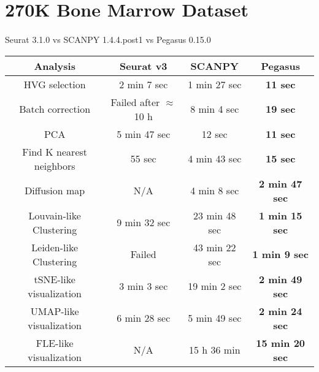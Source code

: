 \documentclass[10pt]{article}
\begin{document}
\section{270K Bone Marrow Dataset}

\paragraph{}
Seurat 3.1.0 \qquad vs \qquad SCANPY 1.4.4.post1 \qquad vs \qquad Pegasus 0.15.0

\begin{table}[H]
	\centering
	\begin{tabular}{|c|c|c|c|}
		\hline
		Analysis & Seurat v3 & SCANPY & Pegasus\\
		\hline \hline
		HVG selection & 2 min 7 sec & 1 min 27 sec & \textbf{11 sec} \\
		\hline
		Batch correction & Failed after $\approx$ 10 h & 8 min 4 sec & \textbf{19 sec} \\
		\hline
		PCA & 5 min 47 sec & 12 sec & \textbf{11 sec} \\
		\hline
		Find K nearest neighbors &  55 sec &  4 min 43 sec & \textbf{15 sec}\\
		\hline
		Diffusion map & N/A & 4 min 8 sec & \textbf{2 min 47 sec} \\
		\hline
		Louvain-like Clustering & 9 min 32 sec & 23 min 48 sec & \textbf{1 min 15 sec} \\
		\hline 
		Leiden-like Clustering & Failed & 43 min 22 sec & \textbf{1 min 9 sec}\\
		\hline
		tSNE-like visualization & 3 min 3 sec & 19 min 2 sec & \textbf{2 min 49 sec}\\
		\hline
		UMAP-like visualization & 6 min 28 sec & 5 min 49 sec  & \textbf{2 min 24 sec}\\
		\hline
		FLE-like visualization & N/A & 15 h 36 min & \textbf{15 min 20 sec}\\
		\hline
	\end{tabular}
\end{table}
\end{document}
